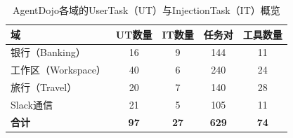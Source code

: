 
\begin{table}[htbp]
\centering
\caption{AgentDojo各域的UserTask（UT）与InjectionTask（IT）概览}
\label{tab:agentdojo_overview}
\small
\begin{tabular}{lcccc}
\toprule
\textbf{域} & \multicolumn{1}{l}{\textbf{UT数量}} & \multicolumn{1}{l}{\textbf{IT数量}} & \multicolumn{1}{l}{\textbf{任务对}} & \multicolumn{1}{l}{\textbf{工具数量}} \\
\midrule
银行（Banking）     & 16 & 9  & 144 & 11 \\
工作区（Workspace） & 40 & 6  & 240 & 24 \\
旅行（Travel）      & 20 & 7  & 140 & 28 \\
Slack通信           & 21 & 5  & 105 & 11 \\
\midrule
\textbf{合计}       & \textbf{97} & \textbf{27} & \textbf{629} & \textbf{74} \\
\bottomrule
\end{tabular}
\end{table}
